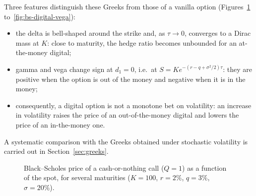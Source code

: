 \documentclass[11pt,a4paper]{article}
\theoremstyle{remark}
\begin{document}
Three features distinguish these Greeks from those of a vanilla option
(Figures~\ref{fig:bs-digital-price} to~\ref{fig:bs-digital-vega}):
\begin{itemize}
  \item the delta is bell-shaped around the strike and, as $\tau \to 0$,
        converges to a Dirac mass at $K$: close to maturity, the hedge ratio
        becomes unbounded for an at-the-money digital;
  \item gamma and vega change sign at $d_1 = 0$, i.e.\ at
        $S = K e^{-(r-q+\sigma^2/2)\tau}$: they are positive when the option
        is out of the money and negative when it is in the money;
  \item consequently, a digital option is not a monotone bet on volatility:
        an increase in volatility raises the price of an out-of-the-money
        digital and lowers the price of an in-the-money one.
\end{itemize}
A systematic comparison with the Greeks obtained under stochastic volatility
is carried out in Section~\ref{sec:greeks}.

\begin{figure}[htbp]
\centering
{}
\caption{Black--Scholes price of a cash-or-nothing call ($Q=1$) as a function
of the spot, for several maturities ($K=100$, $r=2\%$, $q=3\%$,
$\sigma=20\%$).}
\label{fig:bs-digital-price}
\end{figure}
\end{document}
